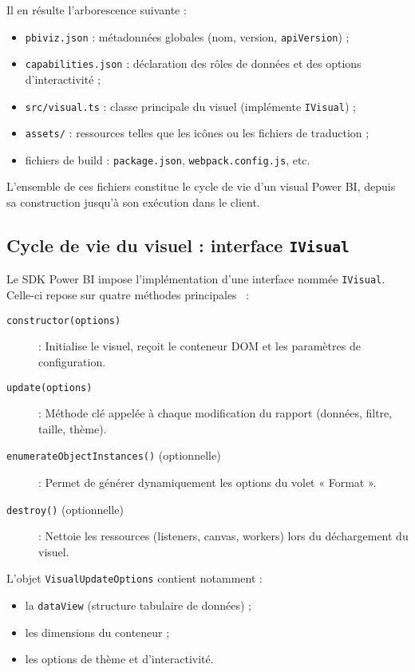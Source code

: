 Il en résulte l’arborescence suivante :
\begin{itemize}
  \item \texttt{pbiviz.json} : métadonnées globales (nom, version, \texttt{apiVersion}) ;
  \item \texttt{capabilities.json} : déclaration des rôles de données et des options d’interactivité ;
  \item \texttt{src/visual.ts} : classe principale du visuel (implémente \texttt{IVisual}) ;
  \item \texttt{assets/} : ressources telles que les icônes ou les fichiers de traduction ;
  \item fichiers de build : \texttt{package.json}, \texttt{webpack.config.js}, etc.
\end{itemize}

L’ensemble de ces fichiers constitue le cycle de vie d’un visual Power BI, depuis sa construction jusqu’à son exécution dans le client.

\subsection{Cycle de vie du visuel : interface \texttt{IVisual}}

Le SDK Power BI impose l’implémentation d’une interface nommée \texttt{IVisual}. Celle-ci repose sur quatre méthodes principales~\parencite{PBIAPIV46_2023} :

\begin{description}
  \item[\texttt{constructor(options)}] : Initialise le visuel, reçoit le conteneur DOM et les paramètres de configuration.
  \item[\texttt{update(options)}] : Méthode clé appelée à chaque modification du rapport (données, filtre, taille, thème).
  \item[\texttt{enumerateObjectInstances()} (optionnelle)] : Permet de générer dynamiquement les options du volet « Format ».
  \item[\texttt{destroy()} (optionnelle)] : Nettoie les ressources (listeners, canvas, workers) lors du déchargement du visuel.
\end{description}

L’objet \texttt{VisualUpdateOptions} contient notamment :
\begin{itemize}
  \item la \texttt{dataView} (structure tabulaire de données) ;
  \item les dimensions du conteneur ;
  \item les options de thème et d’interactivité.
\end{itemize}

